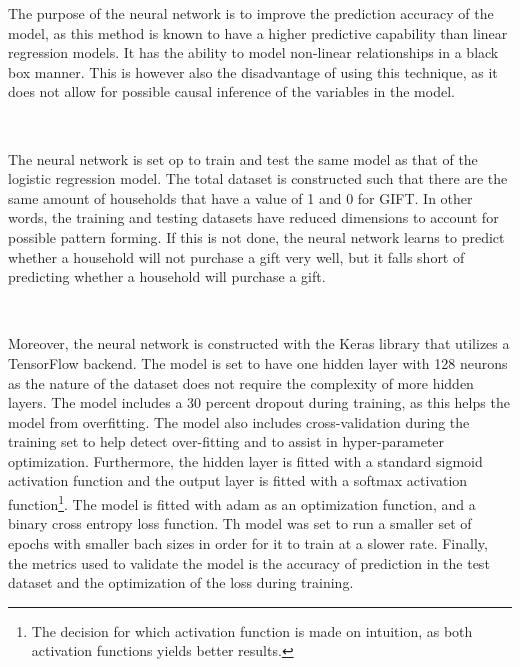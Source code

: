 The purpose of the neural network is to improve the prediction accuracy of the model, as this method is known to have a higher predictive capability than linear regression models. It has the ability to model non-linear relationships in a black box manner. This is however also the disadvantage of using this technique, as it does not allow for possible causal inference of the variables in the model. 

\

The neural network is set op to train and test the same model as that of the logistic regression model. The total dataset is constructed such that there are the same amount of households that have a value of 1 and 0 for GIFT. In other words, the training and testing datasets have reduced dimensions to account for possible pattern forming. If this is not done, the neural network learns to predict whether a household will not purchase a gift very well, but it falls short of predicting whether a household will purchase a gift. 

\

Moreover, the neural network is constructed with the Keras library that utilizes a TensorFlow backend. The model is set to have one hidden layer with 128 neurons as the nature of the dataset does not require the complexity of more hidden layers. The model includes a 30 percent dropout during training, as this helps the model from overfitting\citep{srivastava2014dropout}. The model also includes cross-validation during the training set to help detect over-fitting and to assist in hyper-parameter optimization. Furthermore, the hidden layer is fitted with a standard sigmoid activation function and the output layer is fitted with 
a softmax activation function\footnote{The decision for which activation function is made on intuition, as both activation functions yields better results.}. The model is fitted with adam as an optimization function, and a binary cross entropy loss function. Th model was set to run a smaller set of epochs with smaller bach sizes in order for it to train at a slower rate. Finally, the metrics used to validate the model is the accuracy of prediction in the test dataset and the optimization of the loss during training. 



